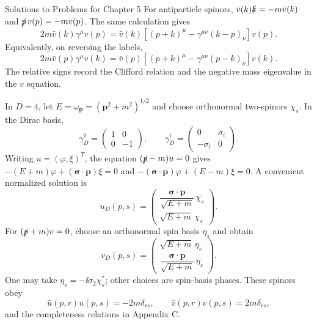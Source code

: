 \begin{bankssolutions}{Solutions to Problems for Chapter 5}
For antiparticle spinors, $\bar v(k)\slashed k=-m\bar v(k)$ and
$\slashed p\,v(p)=-m v(p)$. The same calculation gives
\begin{equation*}
 2m\bar v(k)\gamma^\mu v(p)=\bar v(k)
 \left[(p+k)^\mu-\gamma^{\mu\nu}(k-p)_\nu\right]v(p).
\end{equation*}
Equivalently, on reversing the labels,
\begin{equation*}
 2m\bar v(p)\gamma^\mu v(k)=\bar v(p)
 \left[(p+k)^\mu-\gamma^{\mu\nu}(p-k)_\nu\right]v(k).
\end{equation*}
The relative signs record the Clifford relation and the negative mass eigenvalue
in the $v$ equation.

In $D=4$, let $E=\omega_{\mathbf p}=(\mathbf p^2+m^2)^{1/2}$ and choose orthonormal two-spinors
$\chi_s$. In the Dirac basis,
\begin{equation*}
 \gamma_D^0=\begin{pmatrix}1&0\\0&-1\end{pmatrix},
 \qquad
 \gamma_D^i=\begin{pmatrix}0&\sigma_i\\-\sigma_i&0\end{pmatrix}.
\end{equation*}
Writing $u=(\varphi,\xi)^T$, the equation
$(\slashed p-m)u=0$ gives
$-(E+m)\varphi+(\boldsymbol\sigma\cdot\mathbf p)\xi=0$ and
$-(\boldsymbol\sigma\cdot\mathbf p)\varphi+(E-m)\xi=0$. A convenient normalized
solution is
\begin{equation*}
 u_D(p,s)=\begin{pmatrix}
  \dfrac{\boldsymbol\sigma\cdot\mathbf p}{\sqrt{E+m}}\,\chi_s\\[2pt]
  \sqrt{E+m}\,\chi_s
 \end{pmatrix}.
\end{equation*}
For $(\slashed p+m)v=0$, choose an orthonormal spin basis $\eta_s$ and obtain
\begin{equation*}
 v_D(p,s)=\begin{pmatrix}
  \sqrt{E+m}\,\eta_s\\[2pt]
  \dfrac{\boldsymbol\sigma\cdot\mathbf p}{\sqrt{E+m}}\,\eta_s
 \end{pmatrix}.
\end{equation*}
One may take $\eta_s=-\ii\sigma_2\chi_s^*$; other choices are spin-basis
phases. These spinors obey
\begin{equation*}
  \bar u(p,r)u(p,s)=-2m\delta_{rs},
  \qquad \bar v(p,r)v(p,s)=2m\delta_{rs},
\end{equation*}
and the completeness relations in Appendix C.


\end{bankssolutions}
